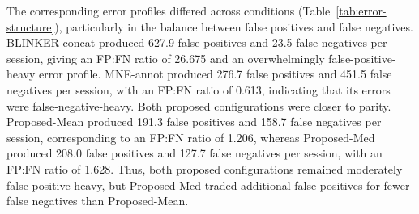 The corresponding error profiles differed across conditions (Table~\ref{tab:error-structure}), particularly in the balance between false positives and false negatives. BLINKER-concat produced 627.9 false positives and 23.5 false negatives per session, giving an FP:FN ratio of 26.675 and an overwhelmingly false-positive-heavy error profile. MNE-annot produced 276.7 false positives and 451.5 false negatives per session, with an FP:FN ratio of 0.613, indicating that its errors were false-negative-heavy. Both proposed configurations were closer to parity. Proposed-Mean produced 191.3 false positives and 158.7 false negatives per session, corresponding to an FP:FN ratio of 1.206, whereas Proposed-Med produced 208.0 false positives and 127.7 false negatives per session, with an FP:FN ratio of 1.628. Thus, both proposed configurations remained moderately false-positive-heavy, but Proposed-Med traded additional false positives for fewer false negatives than Proposed-Mean.
